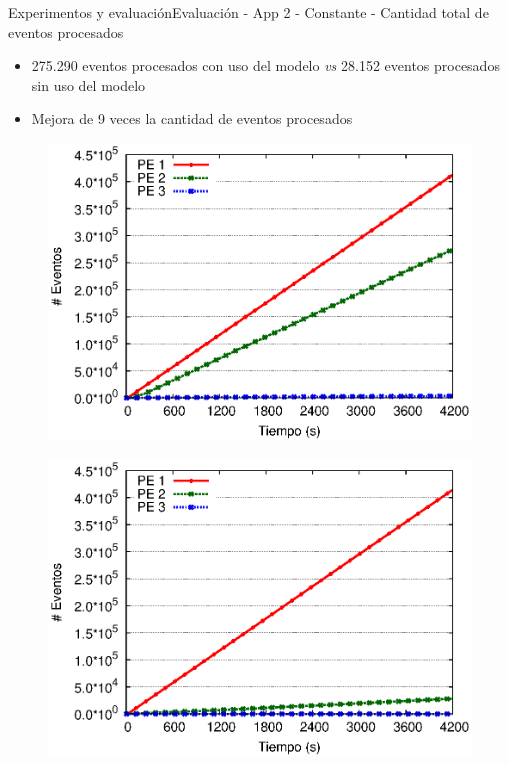 
\begin{frame}{Experimentos y evaluación}{Evaluación - App 2 - Constante - Cantidad total de eventos procesados}

\begin{itemize}
\item 275.290 eventos procesados con uso del modelo \textit{vs} 28.152 eventos procesados sin uso del modelo
\item Mejora de 9 veces la cantidad de eventos procesados
\end{itemize}

\begin{multicols}{2}
\begin{figure}[p]
	\centering
	\includegraphics[scale=0.475]{images/exp/app2/uniform/cm/eventCount.eps}
\end{figure}

\begin{figure}[p]
	\centering
	\includegraphics[scale=0.475]{images/exp/app2/uniform/sm/eventCount.eps}
\end{figure}
\end{multicols}
\end{frame}

